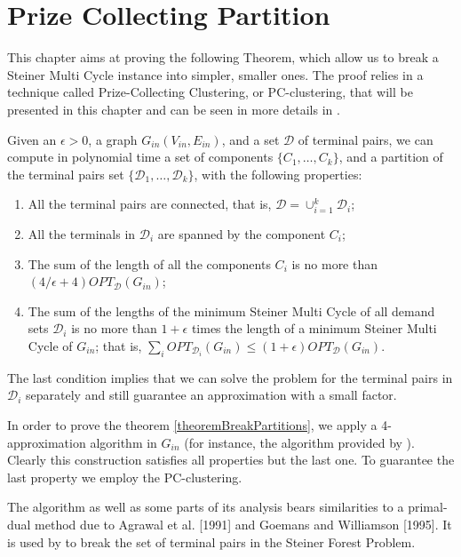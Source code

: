 \chapter{Prize Collecting Partition}
\label{chapter:pc-partition}

This chapter aims at proving the following Theorem, which allow us to break a Steiner Multi Cycle instance into simpler, smaller ones. The proof relies in a technique called Prize-Collecting Clustering, or PC-clustering, that will be presented in this chapter and can be seen in more details in \cite{Bateni}.

\begin{theorem} \label{theoremBreakPartitions}
Given an \(\epsilon > 0\), a graph \(G_{in}(V_{in}, E_{in})\), and a set \(\mathcal{D}\) of terminal pairs, we can compute in polynomial time a set of components \(\{C_1, \dots, C_k\}\), and a partition of the terminal pairs set \(\{\mathcal{D}_1, \dots, \mathcal{D}_k\}\), with the following properties:
\begin{enumerate}
    \item All the terminal pairs are connected, that is, \(\mathcal{D} = \cup_{i=1}^k \mathcal{D}_i\);
    \item All the terminals in \(\mathcal{D}_i\) are spanned by the component \(C_i\);
    \item The sum of the length of all the components \(C_i\) is no more than \((4/\epsilon + 4) OPT_{\mathcal{D}}(G_{in})\);
    \item The sum of the lengths of the minimum Steiner Multi Cycle of all demand sets \(\mathcal{D}_i\) is no more than \(1 + \epsilon\) times the length of a minimum Steiner Multi Cycle of \(G_{in}\); that is, \(\sum_i OPT_{\mathcal{D}_i} (G_{in}) \leq (1 + \epsilon) OPT_{\mathcal{D}} (G_{in})\).
\end{enumerate}
\end{theorem}

The last condition implies that we can solve the problem for the terminal pairs in \(\mathcal{D}_i\) separately and still guarantee an approximation with a small factor.

In order to prove the theorem \ref{theoremBreakPartitions}, we apply a 4-approximation algorithm in \(G_{in}\) (for instance, the algorithm provided by \cite{Pereira2018TheSM}). Clearly this construction satisfies all properties but the last one. To guarantee the last property we employ the PC-clustering.

The algorithm as well as some parts of its analysis bears similarities to a primal-dual method due to Agrawal et al. [1991] and Goemans and Williamson [1995]. It is used by \citeauthor{Bateni} to break the set of terminal pairs in the Steiner Forest Problem.

